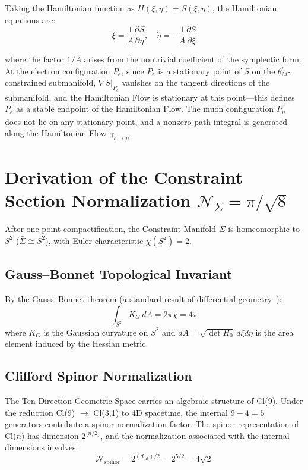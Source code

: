 \documentclass[aps,prd,reprint,nofootinbib]{revtex4-2}
\begin{document}
Taking the Hamiltonian function as $H(\xi, \eta) = S(\xi, \eta)$, the Hamiltonian equations are:
\begin{equation}
\dot{\xi} = \frac{1}{A}\frac{\partial S}{\partial \eta}, \quad \dot{\eta} = -\frac{1}{A}\frac{\partial S}{\partial \xi}
\end{equation}

where the factor $1/A$ arises from the nontrivial coefficient of the symplectic form. At the electron configuration $P_e$, since $P_e$ is a stationary point of $S$ on the $\theta_M^e$-constrained submanifold, $\nabla S|_{P_e}$ vanishes on the tangent directions of the submanifold, and the Hamiltonian Flow is stationary at this point---this defines $P_e$ as a stable endpoint of the Hamiltonian Flow. The muon configuration $P_\mu$ does not lie on any stationary point, and a nonzero path integral is generated along the Hamiltonian Flow $\gamma_{e\to\mu}$.

\section{Derivation of the Constraint Section Normalization $\mathcal{N}_\Sigma = \pi/\sqrt{8}$}
\label{app:normalization}

After one-point compactification, the Constraint Manifold $\Sigma$ is homeomorphic to $S^2$ ($\bar{\Sigma} \cong S^2$), with Euler characteristic $\chi(S^2) = 2$.

\subsection{Gauss--Bonnet Topological Invariant}

By the Gauss--Bonnet theorem (a standard result of differential geometry~\cite{doCarmo1976}):
\begin{equation}
\int_{S^2} K_G \, dA = 2\pi\chi = 4\pi
\end{equation}
where $K_G$ is the Gaussian curvature on $S^2$ and $dA = \sqrt{\det H_0} \, d\xi d\eta$ is the area element induced by the Hessian metric.

\subsection{Clifford Spinor Normalization}

The Ten-Direction Geometric Space carries an algebraic structure of Cl(9). Under the reduction Cl(9) $\to$ Cl(3,1) to 4D spacetime, the internal $9 - 4 = 5$ generators contribute a spinor normalization factor. The spinor representation of Cl($n$) has dimension $2^{\lfloor n/2\rfloor}$, and the normalization associated with the internal dimensions involves:
\begin{equation}
\mathcal{N}_{\text{spinor}} = 2^{(d_{\text{int}})/2} = 2^{5/2} = 4\sqrt{2}
\end{equation}
\end{document}
